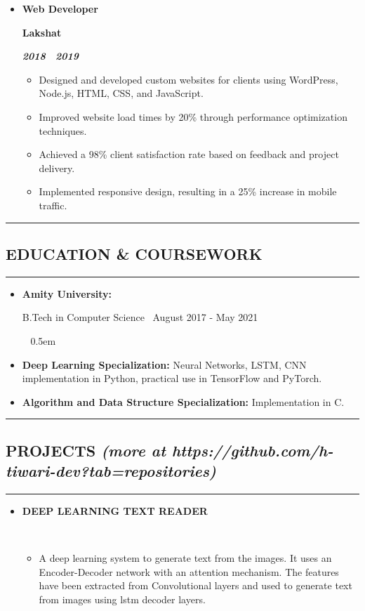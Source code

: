 \documentclass[10pt,letterpaper]{article}
\newcommand{\textbox}[1]{
  \parbox{.333\textwidth}{#1}
}
\newcommand{\textboxtwo}[1]{
  \parbox{.49\textwidth}{#1}
}
\newcommand{\sectionTitle}[1]{
  \hrule
  \vspace{-1.0em} 
  \subsection*{\uppercase{\textbf{#1}} }
  \vspace{-0.3em}
    \hrule
    \vspace{0.3em}  
}
\newcommand{\sectionTitleWithWeb}[2]{
  \hrule
  \vspace{-1.0em} 
  \subsection*{\uppercase{\textbf{#1}} \hfill{\small \textit{(more at #2)}}}
  \vspace{-0.em}
  \hrule
  \vspace{0.3em}  
}
\newcommand{\titleExperienceWithoutLocation}[4]{
  \vspace{1.0em}
  \item[]
  {
    \textbox{\textbf{#1}\hfill}\textbox{\hfil \textbf{#2}\hfil}\hfill \textbf{\emph{#3 \textendash \ #4}}
  }
}
\newcommand{\educationInfo}[4]{
  \vspace{1.0em}
  \textbox{\textbf{#1}\hfill}\textboxtwo{\hfil #2 \textendash \ #3 \hfil}\ #4 
}
\begin{document}
\begin{itemize}[noitemsep,topsep=0pt]
    \titleExperienceWithoutLocation{Web Developer}{Lakshat}{2018}{2019}
    \begin{itemize}[label=\textbullet,noitemsep,topsep=0pt]
      \item Designed and developed custom websites for clients using WordPress, Node.js, HTML, CSS, and JavaScript.
      \item Improved website load times by 20\% through performance optimization techniques.
      \item Achieved a 98\% client satisfaction rate based on feedback and project delivery.
      \item Implemented responsive design, resulting in a 25\% increase in mobile traffic.
    \end{itemize}
  \end{itemize}
  

  \sectionTitle{Education \& Coursework}
  \begin{itemize}
    \parskip=-0.6em
    \vspace*{-0.8em}
    \item \educationInfo{Amity University:}{B.Tech in Computer Science}{August 2017 - May 2021}
    \vspace{0.5em}
    \item \textbf{Deep Learning Specialization:} Neural Networks, LSTM, CNN implementation in Python, practical use in TensorFlow and PyTorch.
    \vspace*{0.4em}
    \item \textbf{Algorithm and Data Structure Specialization:} Implementation in C.
  \end{itemize}


  \vspace{0.30em} 
  
  \sectionTitleWithWeb{Projects}{https://github.com/h-tiwari-dev?tab=repositories}
  \vspace{-0.9em}
  \begin{itemize}
    \parskip=-0.6em 
    \titleExperienceWithoutLocation{DEEP LEARNING TEXT READER}{}{}{}
      \begin{itemize}[label=\textbullet]
        \itemsep0em
        \item A deep learning system to generate text from the images. It uses an Encoder-Decoder network with an attention mechanism. The features have been extracted from Convolutional layers and used to generate text from images using lstm decoder layers.
      \end{itemize}
    \vspace{-0.6em}
  \end{itemize}
  \vspace{0.30em} 
  
\end{document}
